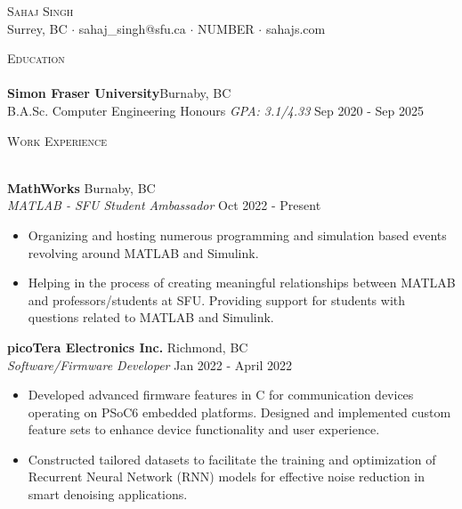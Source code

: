 \documentclass[a4paper]{article}
\newcommand{\lineunder} {
    \vspace*{-8pt} \\
    \hspace*{-18pt} \hrulefill \\
}
\newcommand{\header} [1] {
    {\hspace*{-18pt}\vspace*{6pt} \textsc{#1}}
    \vspace*{-6pt} \lineunder
}
\begin{document}
\vspace*{-40pt}

    

\vspace*{-10pt}
\begin{center}
	{\Huge \scshape {Sahaj Singh}}\\
	Surrey, BC $\cdot$ sahaj\_singh@sfu.ca $\cdot$ NUMBER $\cdot$ sahajs.com\\
\end{center}

\header{Education}
\textbf{Simon Fraser University}\hfill Burnaby, BC\\
B.A.Sc. Computer Engineering Honours \textit{GPA: 3.1/4.33} \hfill Sep 2020 - Sep 2025\\
\vspace{2mm}

\header{Work Experience}
\vspace{1mm}

\textbf{MathWorks} \hfill Burnaby, BC\\
\textit{MATLAB - SFU Student Ambassador} \hfill Oct 2022 - Present\\
\vspace{-1mm}
\begin{itemize} \itemsep 1pt
	\item Organizing and hosting numerous programming and simulation based events revolving around MATLAB and Simulink.
	\item Helping in the process of creating meaningful relationships between MATLAB and professors/students at SFU. Providing support for students with questions related to MATLAB and Simulink.
\end{itemize}
\textbf{picoTera Electronics Inc.} \hfill Richmond, BC\\
\textit{Software/Firmware Developer} \hfill Jan 2022 - April 2022\\
\vspace{-1mm}
\begin{itemize} \itemsep 1pt
	\item Developed advanced firmware features in C for communication devices operating on PSoC6 embedded platforms. Designed and implemented custom feature sets to enhance device functionality and user experience.
	\item Constructed tailored datasets to facilitate the training and optimization of Recurrent Neural Network (RNN) models for effective noise reduction in smart denoising applications.
\end{itemize}
\end{document}
